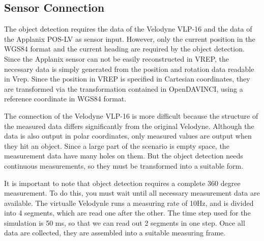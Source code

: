 \documentclass[11pt,oneside,openright]{mpreport}
\begin{document}
\subsection{Sensor Connection}
The object detection requires the data of the Velodyne VLP-16 and the data of the Applanix POS-LV as sensor input.
However, only the current position in the WGS84 format and the current heading are required by the object detection.
Since the Applanix sensor can not be easily reconstructed in VREP, the necessary data is simply generated from the position and rotation data readable in Vrep.
Since the position in VREP is specified in Cartesian coordinates, they are transformed via the transformation contained in OpenDAVINCI, using a reference coordinate in WGS84 format.

The connection of the Velodyne VLP-16 is more difficult because the structure of the measured data differs significantly from the original Velodyne.
Although the data is also output in polar coordinates, only measured values are output when they hit an object. Since a large part of the scenario is empty space,
the measurement data have many holes on them. But the object detection needs continuous measurements, so they must be transformed into a suitable form.

It is important to note that object detection requires a complete 360 degree measurement. To do this, you must wait until all necessary measurement data are available.
The virtualle Velodynle runs a measuring rate of 10Hz, and is divided into 4 segments, which are read one after the other. 
The time step used for the simulation is 50 ms, so that we can read out 2 segments in one step. Once all data are collected, they are assembled into a suitable measuring frame.
\end{document}
